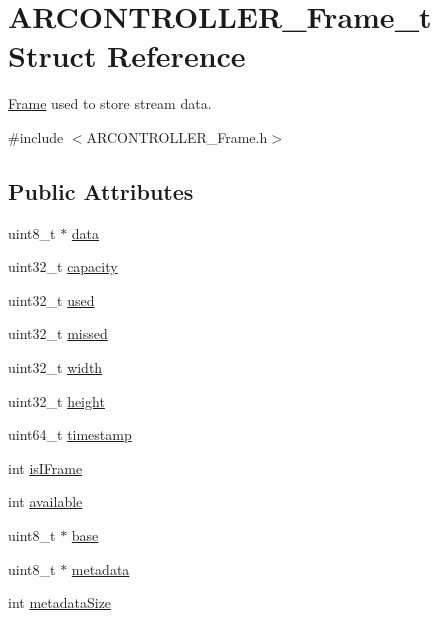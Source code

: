 \hypertarget{struct_a_r_c_o_n_t_r_o_l_l_e_r___frame__t}{}\section{A\+R\+C\+O\+N\+T\+R\+O\+L\+L\+E\+R\+\_\+\+Frame\+\_\+t Struct Reference}
\label{struct_a_r_c_o_n_t_r_o_l_l_e_r___frame__t}


\hyperlink{struct_frame}{Frame} used to store stream data.  




{\ttfamily \#include $<$A\+R\+C\+O\+N\+T\+R\+O\+L\+L\+E\+R\+\_\+\+Frame.\+h$>$}

\subsection*{Public Attributes}
\begin{DoxyCompactItemize}
\item 
uint8\+\_\+t $\ast$ \hyperlink{struct_a_r_c_o_n_t_r_o_l_l_e_r___frame__t_a5122c89063c545d857dd5d42f2c224ae}{data}
\item 
uint32\+\_\+t \hyperlink{struct_a_r_c_o_n_t_r_o_l_l_e_r___frame__t_a9f0f2b8c097642057a35c0d03f257d49}{capacity}
\item 
uint32\+\_\+t \hyperlink{struct_a_r_c_o_n_t_r_o_l_l_e_r___frame__t_ad65eb74407405e66fa3ff47e53c02ee5}{used}
\item 
uint32\+\_\+t \hyperlink{struct_a_r_c_o_n_t_r_o_l_l_e_r___frame__t_aed2b924c47bea38c6f16ab466f0ec7b7}{missed}
\item 
uint32\+\_\+t \hyperlink{struct_a_r_c_o_n_t_r_o_l_l_e_r___frame__t_ab41e19bcf0b5513cb2886c169d74d692}{width}
\item 
uint32\+\_\+t \hyperlink{struct_a_r_c_o_n_t_r_o_l_l_e_r___frame__t_a7c9f8d94a53b860096e8878e2e5e6ce7}{height}
\item 
uint64\+\_\+t \hyperlink{struct_a_r_c_o_n_t_r_o_l_l_e_r___frame__t_a0463e0aa3090ab0736684587fff441b3}{timestamp}
\item 
int \hyperlink{struct_a_r_c_o_n_t_r_o_l_l_e_r___frame__t_acda3aab8cf69a6f6ac23a6bc2e86f4cd}{is\+I\+Frame}
\item 
int \hyperlink{struct_a_r_c_o_n_t_r_o_l_l_e_r___frame__t_a715792065d73509d5d29b4580ec791cb}{available}
\item 
uint8\+\_\+t $\ast$ \hyperlink{struct_a_r_c_o_n_t_r_o_l_l_e_r___frame__t_a6f3b5e7c3be23df4291cfafaa17e3300}{base}
\item 
uint8\+\_\+t $\ast$ \hyperlink{struct_a_r_c_o_n_t_r_o_l_l_e_r___frame__t_ad3165486da3b6219238dd3120f3276f1}{metadata}
\item 
int \hyperlink{struct_a_r_c_o_n_t_r_o_l_l_e_r___frame__t_a1f2926b145f6c1e00f7304cfb7b10482}{metadata\+Size}
\end{DoxyCompactItemize}


